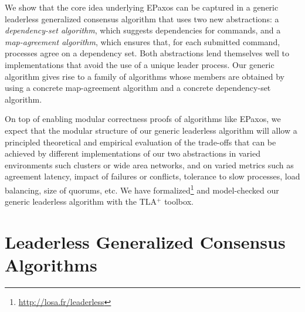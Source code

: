We show that the core idea underlying EPaxos can be captured in a generic leaderless generalized consensus algorithm that uses two new abstractions: a \textit{dependency-set algorithm}, which suggests dependencies for commands, and a \textit{map-agreement algorithm}, which ensures that, for each submitted command, processes agree on a dependency set. Both abstractions lend themselves well to implementations that avoid the use of a unique leader process.
Our generic algorithm gives rise to a family of algorithms whose members are obtained by using a concrete map-agreement algorithm and a concrete dependency-set algorithm. 

On top of enabling modular correctness proofs of algorithms like EPaxos, we expect that the modular structure of our generic leaderless algorithm will allow a principled theoretical and empirical evaluation of the trade-offs that can be achieved by different implementations of our two abstractions in varied environments such clusters or wide area networks, and on varied metrics such as agreement latency, impact of failures or conflicts, tolerance to slow processes, load
balancing, size of quorums, etc.
We have formalized\footnote{\url{http://losa.fr/leaderless}} and model-checked our generic leaderless algorithm with the TLA$^+$ toolbox.

\section{Leaderless Generalized Consensus Algorithms}

